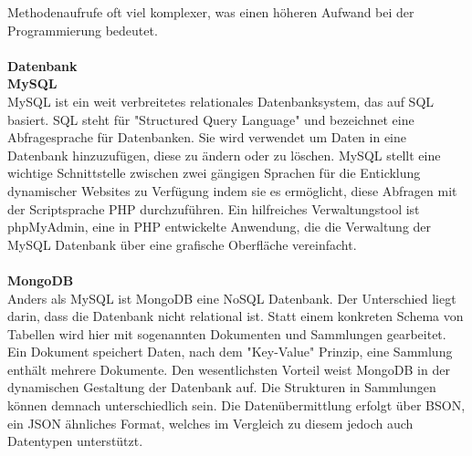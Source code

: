 {    Methodenaufrufe oft viel komplexer, was einen höheren Aufwand bei der Programmierung bedeutet.\\
    \\
    \textbf{Datenbank}\\
    \textbf{MySQL}\\
    MySQL ist ein weit verbreitetes relationales Datenbanksystem, das auf SQL basiert. SQL steht für "Structured Query Language" und bezeichnet eine Abfragesprache für Datenbanken.
    Sie wird verwendet um Daten in eine Datenbank hinzuzufügen, diese zu ändern oder zu löschen. MySQL stellt eine wichtige Schnittstelle zwischen zwei gängigen Sprachen für
    die Enticklung dynamischer Websites zu Verfügung indem sie es ermöglicht, diese Abfragen mit der Scriptsprache PHP durchzuführen. Ein hilfreiches Verwaltungstool ist phpMyAdmin,
    eine in PHP entwickelte Anwendung, die die Verwaltung der MySQL Datenbank über eine grafische Oberfläche vereinfacht.\\
    \\
    \textbf{MongoDB}\\
    Anders als MySQL ist {MongoDB\cite{mongodb}} eine NoSQL Datenbank. Der Unterschied liegt darin, dass die Datenbank nicht relational ist. Statt einem konkreten Schema von Tabellen
    wird hier mit sogenannten Dokumenten und Sammlungen gearbeitet. Ein Dokument speichert Daten, nach dem "Key-Value" Prinzip, eine Sammlung enthält mehrere Dokumente.
    Den wesentlichsten Vorteil weist MongoDB in der dynamischen Gestaltung der Datenbank auf. Die Strukturen in Sammlungen können demnach unterschiedlich sein. Die
    Datenübermittlung erfolgt über {BSON\cite{bson}}, ein JSON ähnliches Format, welches im Vergleich zu diesem jedoch auch Datentypen unterstützt.\\
    \\
}
